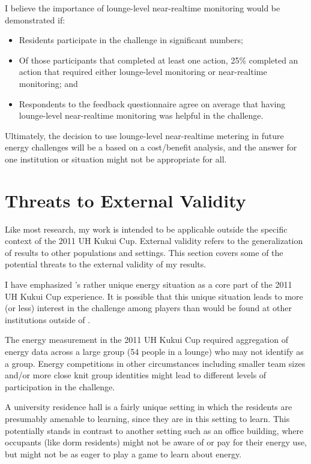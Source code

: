 I believe the importance of lounge-level near-realtime monitoring would be demonstrated if:

\begin{itemize}
	\item Residents participate in the challenge in significant numbers;
	\item Of those participants that completed at least one action, 25\% completed an action that required either lounge-level monitoring or near-realtime monitoring; and
	\item Respondents to the feedback questionnaire agree on average that having lounge-level near-realtime monitoring was helpful in the challenge.
\end{itemize}

Ultimately, the decision to use lounge-level near-realtime metering in future energy challenges will be a based on a cost/benefit analysis, and the answer for one institution or situation might not be appropriate for all.


\section{Threats to External Validity}
\label{sec:external-validity}

Like most research, my work is intended to be applicable outside the specific context of the 2011 UH Kukui Cup. External validity refers to the generalization of results to other populations and settings. This section covers some of the potential threats to the external validity of my results.

I have emphasized \Hawaii's rather unique energy situation as a core part of the 2011 UH Kukui Cup experience. It is possible that this unique situation leads to more (or less) interest in the challenge among players than would be found at other institutions outside of \Hawaii.

The energy measurement in the 2011 UH Kukui Cup required aggregation of energy data across a large group (54 people in a lounge) who may not identify as a group. Energy competitions in other circumstances including smaller team sizes and/or more close knit group identities might lead to different levels of participation in the challenge.

A university residence hall is a fairly unique setting in which the residents are presumably amenable to learning, since they are in this setting to learn. This potentially stands in contrast to another setting such as an office building, where occupants (like dorm residents) might not be aware of or pay for their energy use, but might not be as eager to play a game to learn about energy.


